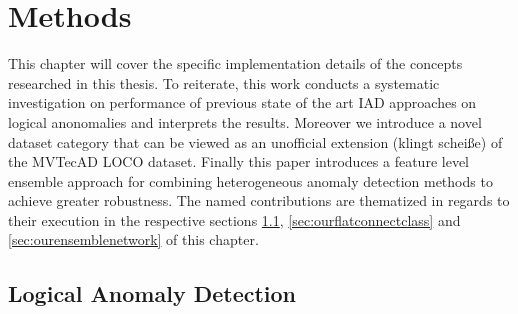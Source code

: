 \chapter{Methods}
\label{chap:method}

This chapter will cover the specific implementation details of the concepts researched in this thesis. To reiterate, this work conducts a systematic investigation on performance of previous state 
of the art IAD approaches on logical anonomalies and interprets the results. Moreover we introduce a novel dataset category that can be viewed as an unofficial extension (klingt scheiße) of the 
MVTecAD LOCO dataset. Finally this paper introduces a feature level ensemble approach for combining heterogeneous anomaly detection methods to achieve greater robustness. The named contributions 
are thematized in regards to their execution in the respective sections \ref{sec:lcocsurveymethods}, \ref{sec:ourflatconnectclass} and \ref{sec:ourensemblenetwork} of this chapter.


\section{Logical Anomaly Detection}
\label{sec:lcocsurveymethods}

